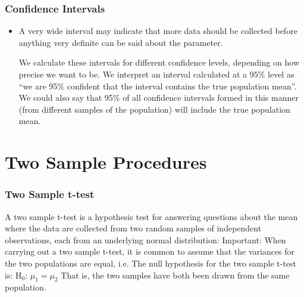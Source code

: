 \documentclass{beamer}
\begin{document}
\begin{frame}
	\frametitle{Confidence Intervals}
	\begin{itemize}
		\item 	A very wide interval may indicate that more data should be
		collected before anything very definite can be said about the
		parameter.
		
		We calculate these intervals for different confidence levels,
		depending on how precise we want to be. We interpret an interval
		calculated at a 95\% level as “we are 95\% confident that the interval
		contains the true population mean”.
		We could also say that 95\% of all confidence intervals formed in
		this manner (from different samples of the population) will include
		the true population mean.
	\end{itemize}
	
	
\end{frame}

\section{Two Sample Procedures}
\begin{frame}
	\frametitle{Two Sample t-test}
	A two sample t-test is a hypothesis test for answering questions
	about the mean where the data are collected from two random
	samples of independent observations, each from an underlying
	normal distribution:
	Important: When carrying out a two sample t-test, it is common to
	assume that the variances for the two populations are equal, i.e.
	The null hypothesis for the two sample t-test is:
	H$_0$: $\mu_1 = \mu_2$
	That is, the two samples have both been drawn from the same
	population. 
\end{frame}
\end{document}
